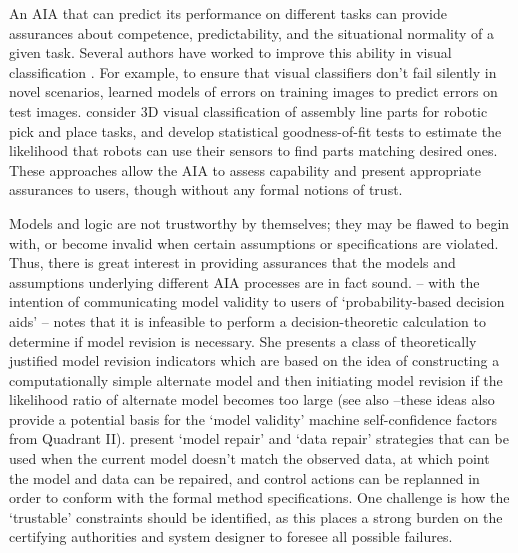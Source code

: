 An AIA that can predict its performance on different tasks can provide assurances about competence, predictability, and the situational normality of a given task. Several authors have worked to improve this ability in visual classification \cite{Zhang2014-he,Gurau2016-hs,Churchill2015-ei,Kaipa2015-hy}. 
For example, to ensure that visual classifiers don't fail silently in novel scenarios, 
\citet{Zhang2014-he} learned models of errors on training images to predict errors on test images. 
\citet{Kaipa2015-hy} consider 3D visual classification of assembly line parts for robotic pick and place tasks, and develop statistical goodness-of-fit tests to estimate the likelihood that robots can use their sensors to find parts matching desired ones. %
These approaches allow the AIA to assess capability and present appropriate assurances to users, though without any formal notions of trust. 

Models and logic are not trustworthy by themselves; they may be flawed to begin with, or become invalid when certain assumptions or specifications are violated. Thus, there is great interest in providing assurances that the models and assumptions underlying different AIA processes are in fact sound. \citet{Laskey1991-mf} -- with the intention of communicating model validity to users of `probability-based decision aids' -- notes that it is infeasible to perform a decision-theoretic calculation to determine if model revision is necessary. 
She presents a class of theoretically justified model revision indicators which are based on the idea of constructing a computationally simple alternate model and then initiating model revision if the likelihood ratio of alternate model becomes too large (see also \citet{Zagorecki2015-qy,Habbema1976-xd} --these ideas also provide a potential basis for the `model validity' machine self-confidence factors from Quadrant II).
\citet{Ghosh2016-dl}  present `model repair' and `data repair' strategies that can be used when the current model doesn't match the observed data, at which point the model and data can be repaired, and control actions can be replanned in order to conform with the formal method specifications. One challenge is how the `trustable' constraints should be identified, as this places a strong burden on the certifying authorities and system designer to foresee all possible failures.

